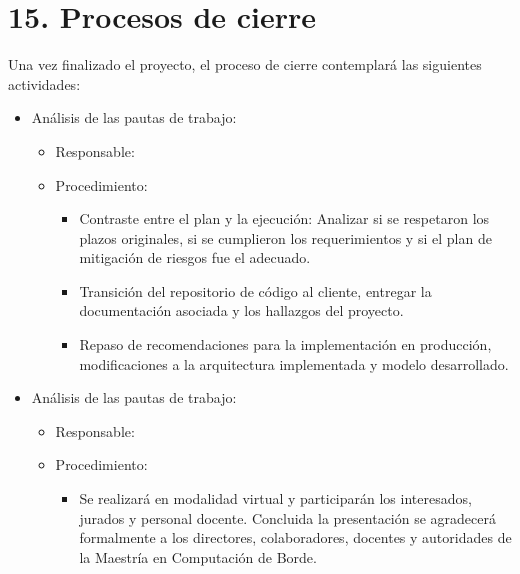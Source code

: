 \documentclass[
11pt, %
]{charter}
\begin{document}
\section{15. Procesos de cierre}    
\label{sec:cierre}

Una vez finalizado el proyecto, el proceso de cierre contemplará las siguientes actividades:
\begin{itemize}
	\item Análisis de las pautas de trabajo:
	\begin{itemize}
		\item[] Responsable: \authorname
		\item[] Procedimiento:
		\begin{itemize}
			\item Contraste entre el plan y la ejecución: Analizar si se respetaron los plazos originales, si se cumplieron los requerimientos y si el plan de mitigación de riesgos fue el adecuado.
			\item Transición del repositorio de código al cliente, entregar la documentación asociada y los hallazgos del proyecto.
			\item Repaso de recomendaciones para la implementación en producción, modificaciones a la arquitectura implementada y modelo desarrollado.
		\end{itemize}
	\end{itemize}
		\item Análisis de las pautas de trabajo:
	\begin{itemize}
		\item[] Responsable: \authorname
		\item[] Procedimiento:
		\begin{itemize}
			\item Se realizará en modalidad virtual y participarán los interesados, jurados y personal docente. Concluida la presentación se agradecerá formalmente a los directores, colaboradores, docentes y autoridades de la Maestría en Computación de Borde.

		\end{itemize}
		\end{itemize}
\end{itemize}
\end{document}
